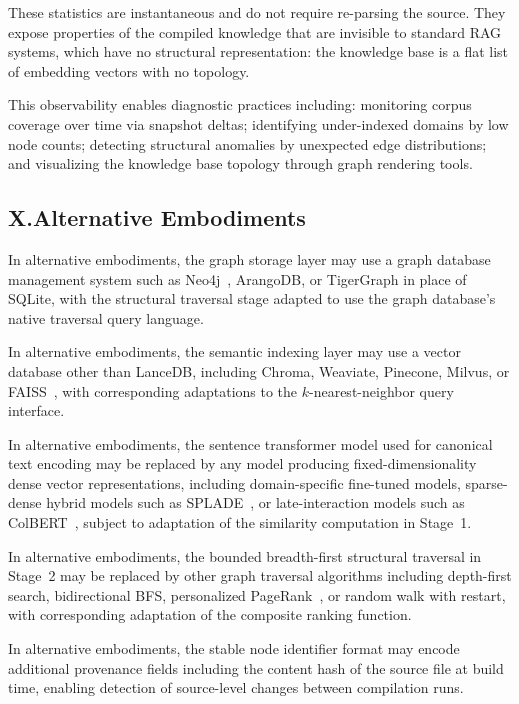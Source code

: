 \documentclass[12pt]{article}
\begin{document}
These statistics are instantaneous and do not require re-parsing the source. They
expose properties of the compiled knowledge that are invisible to standard RAG
systems, which have no structural representation: the knowledge base is a flat
list of embedding vectors with no topology.

This observability enables diagnostic practices including: monitoring corpus
coverage over time via snapshot deltas; identifying under-indexed domains by low
node counts; detecting structural anomalies by unexpected edge distributions; and
visualizing the knowledge base topology through graph rendering tools.

\subsection{X.\quad Alternative Embodiments}

In alternative embodiments, the graph storage layer may use a graph database
management system such as Neo4j~\cite{neo4j}, ArangoDB, or TigerGraph in place
of SQLite, with the structural traversal stage adapted to use the graph
database's native traversal query language.

In alternative embodiments, the semantic indexing layer may use a vector database
other than LanceDB, including Chroma, Weaviate, Pinecone, Milvus, or
FAISS~\cite{johnson2021faiss}, with corresponding adaptations to the
$k$-nearest-neighbor query interface.

In alternative embodiments, the sentence transformer model used for canonical
text encoding may be replaced by any model producing fixed-dimensionality dense
vector representations, including domain-specific fine-tuned models,
sparse-dense hybrid models such as SPLADE~\cite{formal2021splade}, or
late-interaction models such as ColBERT~\cite{khattab2020colbert}, subject to
adaptation of the similarity computation in Stage~1.

In alternative embodiments, the bounded breadth-first structural traversal in
Stage~2 may be replaced by other graph traversal algorithms including depth-first
search, bidirectional BFS, personalized PageRank~\cite{page1999pagerank}, or
random walk with restart, with corresponding adaptation of the composite ranking
function.

In alternative embodiments, the stable node identifier format may encode
additional provenance fields including the content hash of the source file at
build time, enabling detection of source-level changes between compilation runs.
\end{document}
